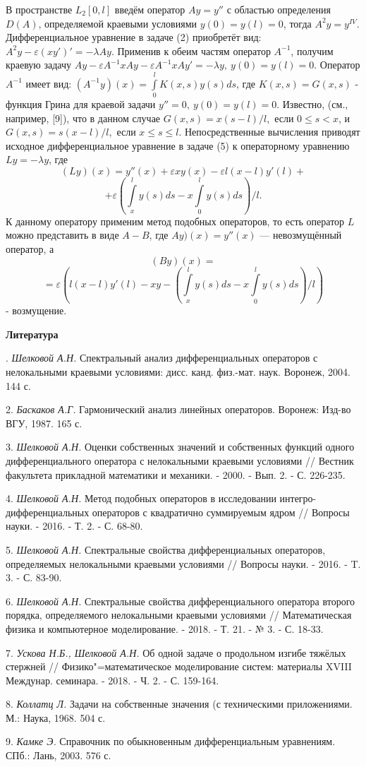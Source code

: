 В пространстве $L_{2}[0,l]$ введём оператор $Ay=y''$ с областью определения $D(A)$, определяемой краевыми условиями $y(0)=y(l)=0$, тогда $A^{2}y=y^{IV}$. Дифференциальное уравнение в задаче (2) приобретёт вид: $A^{2}y-\varepsilon(xy')'=-{\lambda}Ay$. Применив к обеим частям оператор $A^{-1}$, получим краевую задачу $Ay-{\varepsilon}A^{-1}xAy-{\varepsilon}A^{-1}xAy'=-{\lambda}y, ~ y(0)=y(l)=0$.
Оператор $A^{-1}$ имеет вид: $(A^{-1}y)(x)=\int\limits_0^l{K(x,s)y(s)}ds$, где $K(x,s)=G(x,s)$ - функция Грина для краевой задачи $y''=0,~y(0)=y(l)=0$.
Известно, (см., например, [9]), что в данном случае $G(x,s)=x(s-l)/l$,~если $0\le{s}<x$, и $G(x,s)=s(x-l)/l$,~если $x\le{s}\le{l}$.
Непосредственные вычисления приводят исходное дифференциальное уравнение в задаче (5) к операторному уравнению $Ly=-{\lambda}y$, где
$$(Ly)(x)=y''(x)+{\varepsilon}xy(x)-{\varepsilon}l(x-l)y'(l)+$$
$$+\varepsilon\left(\int\limits_x^l{y(s)}ds-x\int\limits_0^l{y(s)}ds\right)/l.$$
К данному оператору применим метод подобных операторов, то есть оператор $L$ можно представить в виде $A-B$, где $Ay)(x)=y''(x)$ --- невозмущённый оператор, а
$$(By)(x) = $$
$$ = {\varepsilon}\left(l(x-l)y'(l)-xy-\left(\int\limits_x^l{y(s)}ds-x\int\limits_0^l{y(s)}ds\right)/l\right)$$
- возмущение.



\smallskip \centerline {\bf Литература} . {\it Шелковой А.Н.} Спектральный анализ дифференциальных операторов с нелокальными краевыми условиями: дисс. канд. физ.-мат. наук. Воронеж, 2004. 144 с.

2. {\it Баскаков А.Г.} Гармонический анализ линейных операторов. Воронеж: Изд-во ВГУ, 1987. 165 с.

3. {\it Шелковой А.Н.} Оценки собственных значений и собственных функций одного дифференциального оператора с нелокальными краевыми условиями // Вестник факультета прикладной математики и механики. - 2000. - Вып. 2. - С. 226-235.

4. {\it Шелковой А.Н.} Метод подобных операторов в исследовании интегро-дифференциальных операторов с квадратично суммируемым ядром // Вопросы науки. - 2016. - Т. 2. - С. 68-80.

5. {\it Шелковой А.Н.} Спектральные свойства дифференциальных операторов, определяемых нелокальными краевыми условиями // Вопросы науки. - 2016. - T. 3. - С. 83-90.

6. {\it Шелковой А.Н.} Спектральные свойства дифференциального оператора второго порядка, определяемого нелокальными краевыми условиями // Математическая физика и компьютерное моделирование. - 2018. - Т. 21. - № 3. - С. 18-33.

7. {\it Ускова Н.Б., Шелковой А.Н.} Об одной задаче о продольном изгибе тяжёлых стержней // Физико"=математическое моделирование систем: материалы XVIII\\Междунар. семинара. - 2018. - Ч. 2. - С. 159-164.

8. {\it Коллатц Л.} Задачи на собственные значения (с техническими приложениями. М.: Наука, 1968. 504 с.

9. {\it Камке Э.} Справочник по обыкновенным дифференциальным уравнениям. СПб.: Лань, 2003. 576 с.
